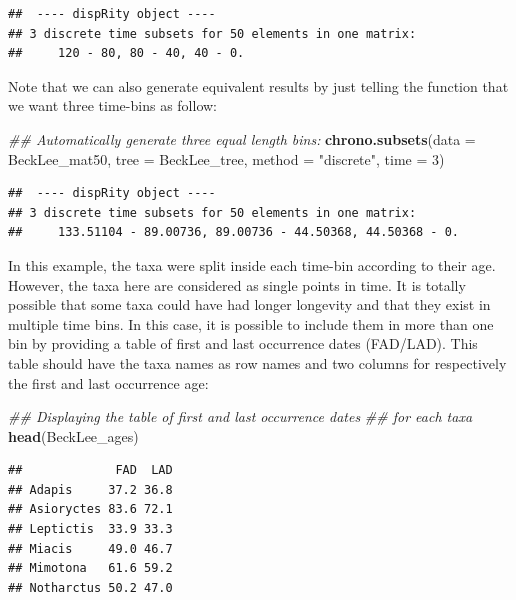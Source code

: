\documentclass[]{book}
\newenvironment{Shaded}{\begin{snugshade}}{\end{snugshade}}
\newcommand{\CommentTok}[1]{\textcolor[rgb]{0.56,0.35,0.01}{\textit{#1}}}
\newcommand{\DataTypeTok}[1]{\textcolor[rgb]{0.13,0.29,0.53}{#1}}
\newcommand{\DecValTok}[1]{\textcolor[rgb]{0.00,0.00,0.81}{#1}}
\newcommand{\KeywordTok}[1]{\textcolor[rgb]{0.13,0.29,0.53}{\textbf{#1}}}
\newcommand{\NormalTok}[1]{#1}
\newcommand{\StringTok}[1]{\textcolor[rgb]{0.31,0.60,0.02}{#1}}
\begin{document}
\begin{verbatim}
##  ---- dispRity object ---- 
## 3 discrete time subsets for 50 elements in one matrix:
##     120 - 80, 80 - 40, 40 - 0.
\end{verbatim}

Note that we can also generate equivalent results by just telling the function that we want three time-bins as follow:

\begin{Shaded}
\begin{Highlighting}[]
\CommentTok{## Automatically generate three equal length bins:}
\KeywordTok{chrono.subsets}\NormalTok{(}\DataTypeTok{data =}\NormalTok{ BeckLee_mat50, }\DataTypeTok{tree =}\NormalTok{ BeckLee_tree,}
               \DataTypeTok{method =} \StringTok{"discrete"}\NormalTok{,}
               \DataTypeTok{time =} \DecValTok{3}\NormalTok{)}
\end{Highlighting}
\end{Shaded}

\begin{verbatim}
##  ---- dispRity object ---- 
## 3 discrete time subsets for 50 elements in one matrix:
##     133.51104 - 89.00736, 89.00736 - 44.50368, 44.50368 - 0.
\end{verbatim}

In this example, the taxa were split inside each time-bin according to their age.
However, the taxa here are considered as single points in time.
It is totally possible that some taxa could have had longer longevity and that they exist in multiple time bins.
In this case, it is possible to include them in more than one bin by providing a table of first and last occurrence dates (FAD/LAD).
This table should have the taxa names as row names and two columns for respectively the first and last occurrence age:

\begin{Shaded}
\begin{Highlighting}[]
\CommentTok{## Displaying the table of first and last occurrence dates}
\CommentTok{## for each taxa}
\KeywordTok{head}\NormalTok{(BeckLee_ages)}
\end{Highlighting}
\end{Shaded}

\begin{verbatim}
##             FAD  LAD
## Adapis     37.2 36.8
## Asioryctes 83.6 72.1
## Leptictis  33.9 33.3
## Miacis     49.0 46.7
## Mimotona   61.6 59.2
## Notharctus 50.2 47.0
\end{verbatim}
\end{document}
